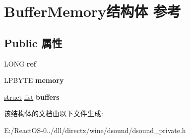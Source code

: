 \hypertarget{struct_buffer_memory}{}\section{Buffer\+Memory结构体 参考}
\label{struct_buffer_memory}
\subsection*{Public 属性}
\begin{DoxyCompactItemize}
\item 
\mbox{\label{struct_buffer_memory_a5f9975a47b6286eb17baceae023cf9a0}} 
L\+O\+NG {\bfseries ref}
\item 
\mbox{\label{struct_buffer_memory_a1a22a57d4c635a935ce6403d1410b216}} 
L\+P\+B\+Y\+TE {\bfseries memory}
\item 
\mbox{\label{struct_buffer_memory_a3c555cf73e1f8ed0f5407f489e37388f}} 
\hyperlink{interfacestruct}{struct} \hyperlink{classlist}{list} {\bfseries buffers}
\end{DoxyCompactItemize}


该结构体的文档由以下文件生成\+:\begin{DoxyCompactItemize}
\item 
E\+:/\+React\+O\+S-\/0../dll/directx/wine/dsound/dsound\+\_\+private.\+h\end{DoxyCompactItemize}

